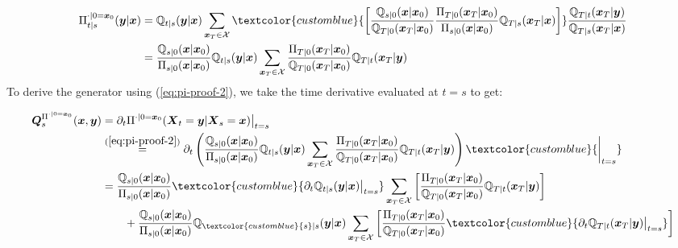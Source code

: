 \documentclass{article}
\newcommand{\bluetext}[1]{\textcolor{customblue}{#1}}
\begin{document}
\begin{align}
    \Pi^{\cdot|0=\boldsymbol{x}_0}_{t|s}(\boldsymbol{y}|\boldsymbol{x})&=\mathbb{Q}_{t|s}(\boldsymbol{y}|\boldsymbol{x})\sum_{\boldsymbol{x}_T\in \mathcal{X}}\bluetext{\left[\frac{\mathbb{Q}_{s|0}(\boldsymbol{x}|\boldsymbol{x}_0)}{\mathbb{Q}_{T|0}(\boldsymbol{x}_T|\boldsymbol{x}_0)}\frac{\Pi_{T|0}(\boldsymbol{x}_T|\boldsymbol{x}_0)}{\Pi_{s|0}(\boldsymbol{x}|\boldsymbol{x}_0)}\mathbb{Q}_{T|s}(\boldsymbol{x}_T|\boldsymbol{x})\right]}\frac{\mathbb{Q}_{T|t}(\boldsymbol{x}_T|\boldsymbol{y})}{\mathbb{Q}_{T|s}(\boldsymbol{x}_T|\boldsymbol{x})}\nonumber\\
    &=\frac{\mathbb{Q}_{s|0}(\boldsymbol{x}|\boldsymbol{x}_0)}{\Pi_{s|0}(\boldsymbol{x}|\boldsymbol{x}_0)}\mathbb{Q}_{t|s}(\boldsymbol{y}|\boldsymbol{x})\sum_{\boldsymbol{x}_T\in \mathcal{X}}\frac{\Pi_{T|0}(\boldsymbol{x}_T|\boldsymbol{x}_0)}{\mathbb{Q}_{T|0}(\boldsymbol{x}_T|\boldsymbol{x}_0)}\mathbb{Q}_{T|t}(\boldsymbol{x}_T|\boldsymbol{y})\label{eq:pi-proof-2}
\end{align}
To derive the generator using (\ref{eq:pi-proof-2}), we take the time derivative evaluated at $t=s$ to get: 
\begin{small}
\begin{align}
    \boldsymbol{Q}_s^{\Pi^{\cdot|0=\boldsymbol{x}_0}}(\boldsymbol{x},\boldsymbol{y})&=\partial_t\Pi^{\cdot|0=\boldsymbol{x}_0}(\boldsymbol{X}_t=\boldsymbol{y}|\boldsymbol{X}_s=\boldsymbol{x})\big\vert_{t=s}\nonumber\\
    &\overset{(\ref{eq:pi-proof-2})}{=}\partial_t\left(\frac{\mathbb{Q}_{s|0}(\boldsymbol{x}|\boldsymbol{x}_0)}{\Pi_{s|0}(\boldsymbol{x}|\boldsymbol{x}_0)}\mathbb{Q}_{t|s}(\boldsymbol{y}|\boldsymbol{x})\sum_{\boldsymbol{x}_T\in \mathcal{X}}\frac{\Pi_{T|0}(\boldsymbol{x}_T|\boldsymbol{x}_0)}{\mathbb{Q}_{T|0}(\boldsymbol{x}_T|\boldsymbol{x}_0)}\mathbb{Q}_{T|t}(\boldsymbol{x}_T|\boldsymbol{y})\right)\bluetext{\bigg|_{t=s}}\nonumber\\
    &=\frac{\mathbb{Q}_{s|0}(\boldsymbol{x}|\boldsymbol{x}_0)}{\Pi_{s|0}(\boldsymbol{x}|\boldsymbol{x}_0)}\bluetext{\partial_t\mathbb{Q}_{t|s}(\boldsymbol{y}|\boldsymbol{x})\big|_{t=s}}\sum_{\boldsymbol{x}_T\in \mathcal{X}}\left[\frac{\Pi_{T|0}(\boldsymbol{x}_T|\boldsymbol{x}_0)}{\mathbb{Q}_{T|0}(\boldsymbol{x}_T|\boldsymbol{x}_0)}\mathbb{Q}_{T|t}(\boldsymbol{x}_T|\boldsymbol{y})\right]\nonumber\\
    &\quad \quad +\frac{\mathbb{Q}_{s|0}(\boldsymbol{x}|\boldsymbol{x}_0)}{\Pi_{s|0}(\boldsymbol{x}|\boldsymbol{x}_0)}\mathbb{Q}_{\bluetext{s}|s}(\boldsymbol{y}|\boldsymbol{x})\sum_{\boldsymbol{x}_T\in \mathcal{X}}\left[\frac{\Pi_{T|0}(\boldsymbol{x}_T|\boldsymbol{x}_0)}{\mathbb{Q}_{T|0}(\boldsymbol{x}_T|\boldsymbol{x}_0)}\bluetext{\partial_t\mathbb{Q}_{T|t}(\boldsymbol{x}_T|\boldsymbol{y})\big\vert_{t=s}}\right]
\end{align}
\end{small}
\end{document}
